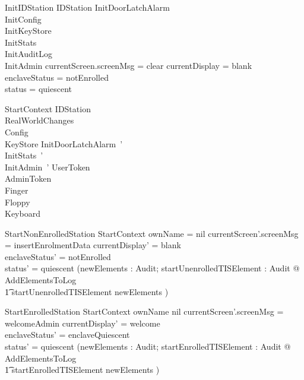 \begin{schema}{InitIDStation}
        IDStation
\also
	InitDoorLatchAlarm
\\	InitConfig
\\      InitKeyStore
\\      InitStats
\\      InitAuditLog
\\      InitAdmin
\where
        currentScreen.screenMsg = clear
\also
	currentDisplay = blank
\\	enclaveStatus = notEnrolled
\\      status = quiescent
\end{schema}

\begin{schema}{StartContext}
        \Delta IDStation
\\      RealWorldChanges
\also
\\      \Xi Config
\\      \Xi KeyStore
\also
	InitDoorLatchAlarm~'
\\      InitStats~'
\\      InitAdmin~'
\also
        \Xi UserToken  
\\      \Xi AdminToken 
\\      \Xi Finger 
\\      \Xi Floppy 
\\      \Xi Keyboard 
\end{schema}

\begin{schema}{StartNonEnrolledStation}
        StartContext
\where 
        ownName = nil
\also
        currentScreen'.screenMsg = insertEnrolmentData
\also
	currentDisplay' = blank
\\	enclaveStatus' = notEnrolled
\\      status' = quiescent
\also
        (\exists newElements : \finset Audit;
        startUnenrolledTISElement : Audit @ AddElementsToLog 
\\ \t1  \land startUnenrolledTISElement \in newElements )
\end{schema}

\begin{schema}{StartEnrolledStation}
        StartContext
\where 
        ownName \neq nil
\also
        currentScreen'.screenMsg = welcomeAdmin
\also
	currentDisplay' = welcome
\\	enclaveStatus' = enclaveQuiescent
\\      status' = quiescent
\also
        (\exists newElements : \finset Audit;
        startEnrolledTISElement : Audit @ AddElementsToLog 
\\ \t1  \land startEnrolledTISElement \in newElements )
\end{schema}

